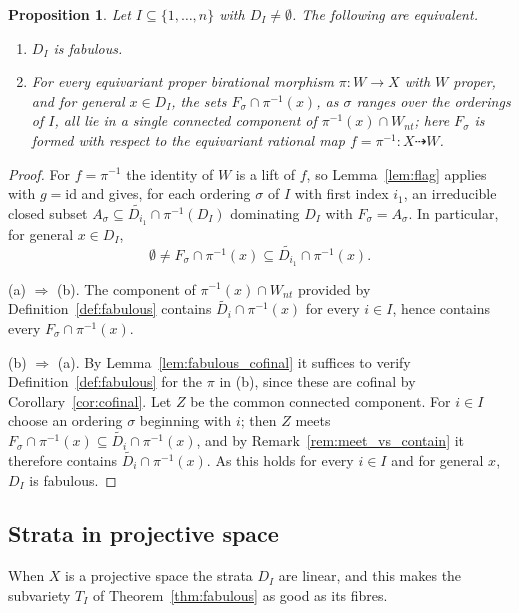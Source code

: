 \documentclass[11pt]{amsart}
\theoremstyle{plain}
\newtheorem{proposition}[theorem]{Proposition}
\theoremstyle{definition}
\theoremstyle{remark}
\numberwithin{equation}{section}
\begin{document}
\begin{proposition} \label{prop:converse}
Let $I \subseteq \{1,\ldots,n\}$ with $D_I \neq \emptyset$.  The following
are equivalent.
\begin{enumerate}
\item $D_I$ is fabulous.
\item For every equivariant proper birational morphism $\pi : W \to X$ with
$W$ proper, and for general $x \in D_I$, the sets $F_\sigma \cap
\pi^{-1}(x)$, as $\sigma$ ranges over the orderings of $I$, all lie in a
single connected component of $\pi^{-1}(x) \cap W_{nt}$; here $F_\sigma$ is
formed with respect to the equivariant rational map
$f = \pi^{-1} : X \dasharrow W$.
\end{enumerate}
\end{proposition}

\begin{proof}
For $f = \pi^{-1}$ the identity of $W$ is a lift of $f$, so
Lemma~\ref{lem:flag} applies with $g = \mathrm{id}$ and gives, for each
ordering $\sigma$ of $I$ with first index $i_1$, an irreducible closed
subset $A_\sigma \subseteq \widetilde{D_{i_1}} \cap \pi^{-1}(D_I)$
dominating $D_I$ with $F_\sigma = A_\sigma$.  In particular, for general
$x \in D_I$,
\[
\emptyset \neq F_\sigma \cap \pi^{-1}(x)
\subseteq \widetilde{D_{i_1}} \cap \pi^{-1}(x) .
\]

(a) $\Rightarrow$ (b).  The component of $\pi^{-1}(x) \cap W_{nt}$ provided
by Definition~\ref{def:fabulous} contains $\widetilde{D_i} \cap
\pi^{-1}(x)$ for every $i \in I$, hence contains every $F_\sigma \cap
\pi^{-1}(x)$.

(b) $\Rightarrow$ (a).  By Lemma~\ref{lem:fabulous_cofinal} it suffices to
verify Definition~\ref{def:fabulous} for the $\pi$ in (b), since these are
cofinal by Corollary~\ref{cor:cofinal}.  Let $Z$ be the common connected
component.  For $i \in I$ choose an ordering $\sigma$ beginning with $i$;
then $Z$ meets $F_\sigma \cap \pi^{-1}(x) \subseteq \widetilde{D_i} \cap
\pi^{-1}(x)$, and by Remark~\ref{rem:meet_vs_contain} it therefore contains
$\widetilde{D_i} \cap \pi^{-1}(x)$.  As this holds for every $i \in I$ and
for general $x$, $D_I$ is fabulous.
\end{proof}

\subsection*{Strata in projective space}

When $X$ is a projective space the strata $D_I$ are linear, and this makes
the subvariety $T_I$ of Theorem~\ref{thm:fabulous} as good as its fibres.
\end{document}
